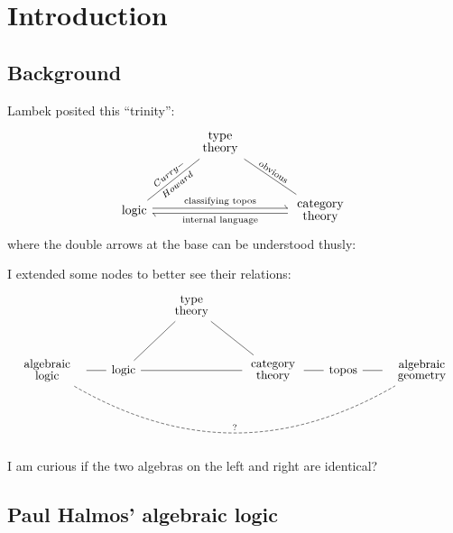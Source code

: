 \chapter{Introduction}\label{chap:introduction}

\section{Background}

Lambek posited this ``trinity'':
\begin{equation}
\begin{tikzcd}[row sep=1cm, column sep=1cm]
& \parbox{1.5cm}{\linespread{-0.5}\selectfont\centering type theory} \arrow[dl,dash,"Curry-","Howard"',sloped] \arrow[dr,dash,"\text{obvious}",sloped] & \\
   \mbox{logic} \arrow[rr,shift left=2pt,harpoon,"\text{classifying topos}"]  & {} & \parbox{1.5cm}{\linespread{-0.5}\selectfont\centering category theory}
   \arrow[ll, shift left=2pt, harpoon, "\text{internal language}"]
\end{tikzcd}
\end{equation}
where the double arrows at the base can be understood thusly:


I extended some nodes to better see their relations:
\begin{equation}
\begin{tikzcd}[row sep=1cm, column sep=0.6cm]
 & & \parbox{1.5cm}{\linespread{-0.5}\selectfont\centering type theory} \arrow[dl,dash] \arrow[dr,dash] & & & \\
\parbox{2cm}{\linespread{-0.5}\selectfont\centering algebraic logic} \arrow[rrrrr, dashed, dash, bend right,"?"] \arrow[r,dash] & \mbox{logic} \arrow[rr,dash] & {} & \parbox{1.5cm}{\linespread{-0.5}\selectfont\centering category theory} \arrow[r,dash] & \mbox{topos} \arrow[r,dash] & \parbox{2cm}{\linespread{-0.5}\selectfont\centering algebraic geometry}
\end{tikzcd}
\end{equation}
I am curious if the two algebras on the left and right are identical?

\section{Paul Halmos' algebraic logic}

